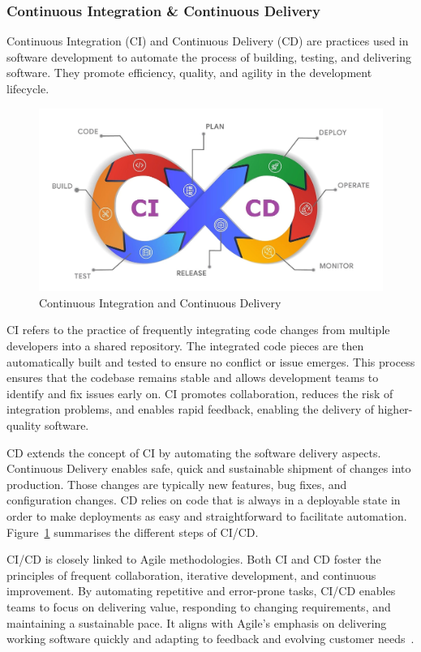 \subsubsection{Continuous Integration \& Continuous Delivery}

Continuous Integration (CI) and Continuous Delivery (CD) are practices used in software development to automate the process of building, testing, and delivering software. They promote efficiency, quality, and agility in the development lifecycle.

\begin{figure}[!ht]
\centering
\includegraphics[width=1\textwidth]{figures/core/cicd.png}
\caption{Continuous Integration and Continuous Delivery~\cite{cicd}}
\label{fig:cicd}
\end{figure}

CI refers to the practice of frequently integrating code changes from multiple developers into a shared repository. The integrated code pieces are then automatically built and tested to ensure no conflict or issue emerges. This process ensures that the codebase remains stable and allows development teams to identify and fix issues early on. CI promotes collaboration, reduces the risk of integration problems, and enables rapid feedback, enabling the delivery of higher-quality software. 

CD extends the concept of CI by automating the software delivery aspects. Continuous Delivery enables safe, quick and sustainable shipment of changes into production. Those changes are typically new features, bug fixes, and configuration changes. CD relies on code that is always in a deployable state in order to make deployments as easy and straightforward to facilitate automation. Figure~\ref{fig:cicd} summarises the different steps of CI/CD.

CI/CD is closely linked to Agile methodologies. Both CI and CD foster the principles of frequent collaboration, iterative development, and continuous improvement. By automating repetitive and error-prone tasks, CI/CD enables teams to focus on delivering value, responding to changing requirements, and maintaining a sustainable pace. It aligns with Agile's emphasis on delivering working software quickly and adapting to feedback and evolving customer needs~\cite{fowler2006continuous,shahin2017continuous,duvall2007continuous,humble2010continuous}.


